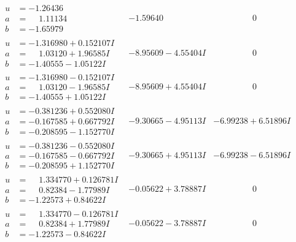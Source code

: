 \documentclass[1p]{elsarticle_modified}
\theoremstyle{definition}
\begin{document}
$$\begin{array}{c|c|c}
\begin{aligned}
u &= -1.26436\phantom{ +0.000000I} \\
a &= \phantom{-}1.11134\phantom{ +0.000000I} \\
b &= -1.65979\phantom{ +0.000000I}\end{aligned}
 & -1.59640\phantom{ +0.000000I} & \phantom{-0.000000 } 0 \\ \hline\begin{aligned}
u &= -1.316980 + 0.152107 I \\
a &= \phantom{-}1.03120 + 1.96585 I \\
b &= -1.40555 - 1.05122 I\end{aligned}
 & -8.95609 - 4.55404 I & \phantom{-0.000000 } 0 \\ \hline\begin{aligned}
u &= -1.316980 - 0.152107 I \\
a &= \phantom{-}1.03120 - 1.96585 I \\
b &= -1.40555 + 1.05122 I\end{aligned}
 & -8.95609 + 4.55404 I & \phantom{-0.000000 } 0 \\ \hline\begin{aligned}
u &= -0.381236 + 0.552080 I \\
a &= -0.167585 + 0.667792 I \\
b &= -0.208595 - 1.152770 I\end{aligned}
 & -9.30665 - 4.95113 I & -6.99238 + 6.51896 I \\ \hline\begin{aligned}
u &= -0.381236 - 0.552080 I \\
a &= -0.167585 - 0.667792 I \\
b &= -0.208595 + 1.152770 I\end{aligned}
 & -9.30665 + 4.95113 I & -6.99238 - 6.51896 I \\ \hline\begin{aligned}
u &= \phantom{-}1.334770 + 0.126781 I \\
a &= \phantom{-}0.82384 - 1.77989 I \\
b &= -1.22573 + 0.84622 I\end{aligned}
 & -0.05622 + 3.78887 I & \phantom{-0.000000 } 0 \\ \hline\begin{aligned}
u &= \phantom{-}1.334770 - 0.126781 I \\
a &= \phantom{-}0.82384 + 1.77989 I \\
b &= -1.22573 - 0.84622 I\end{aligned}
 & -0.05622 - 3.78887 I & \phantom{-0.000000 } 0 \\ \hline\begin{aligned}

\end{aligned}
\end{array}$$
\end{document}
